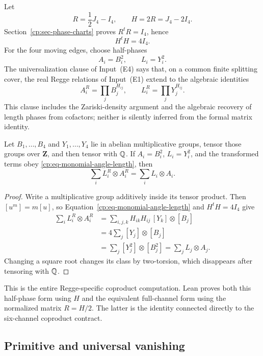 Let
\[
 R=\frac12J_4-I_4,\qquad H=2R=J_4-2I_4.
\]
Section~\ref{cp:sec-phase-charts} proves \(R^tR=I_4\), hence
\begin{equation}
 H^tH=4I_4.
 \label{cp:eq-H-orthogonal}
\end{equation}
For the four moving edges, choose half-phases
\[
 A_i=B_i^2,\qquad L_i=Y_i^2.
\]
The universalization clause of Input~\textup{(E4)} says that, on a common
finite splitting cover, the real Regge relations of Input~\textup{(E1)}
extend to the algebraic identities
\begin{equation}
 A_i^R=\prod_jB_j^{H_{ij}},
 \qquad
 L_i^R=\prod_jY_j^{H_{ij}}.
 \label{cp:eq-monomial-angle-length}
\end{equation}
This clause includes the Zariski-density argument and the algebraic recovery
of length phases from cofactors; neither is silently inferred from the
formal matrix identity.

\begin{lemma}
\label{cp:lem-regge-tensor-cancellation}
Let \(B_1,\ldots,B_4\) and \(Y_1,\ldots,Y_4\) lie in abelian multiplicative
groups, tensor those groups over \(\mathbf Z\), and then tensor with
\(\mathbb Q\).  If \(A_i=B_i^2\), \(L_i=Y_i^2\), and the transformed terms obey
\eqref{cp:eq-monomial-angle-length}, then
\[
 \sum_i L_i^R\otimes A_i^R=\sum_iL_i\otimes A_i.
\]
\end{lemma}

\begin{proof}
Write a multiplicative group additively inside its tensor product.  Then
\([u^m]=m[u]\), so Equation~\eqref{cp:eq-monomial-angle-length} and
\(H^tH=4I_4\) give
\[
 \begin{aligned}
 \sum_i L_i^R\otimes A_i^R
 &=\sum_{i,j,k}H_{ik}H_{ij}\,[Y_k]\otimes[B_j]\\
 &=4\sum_j[Y_j]\otimes[B_j]\\
 &=\sum_j[Y_j^2]\otimes[B_j^2]
  =\sum_jL_j\otimes A_j.
 \end{aligned}
\]
Changing a square root changes its class by two-torsion, which disappears
after tensoring with \(\mathbb Q\).
\end{proof}

This is the entire Regge-specific coproduct computation.  Lean proves both
this half-phase form using \(H\) and the equivalent full-channel form using
the normalized matrix \(R=H/2\).  The latter is the identity connected
directly to the six-channel coproduct contract.

\subsection{Primitive and universal vanishing}

